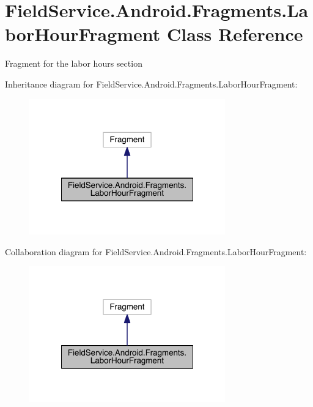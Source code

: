 \hypertarget{class_field_service_1_1_android_1_1_fragments_1_1_labor_hour_fragment}{\section{Field\+Service.\+Android.\+Fragments.\+Labor\+Hour\+Fragment Class Reference}
\label{class_field_service_1_1_android_1_1_fragments_1_1_labor_hour_fragment}
}


Fragment for the labor hours section  




Inheritance diagram for Field\+Service.\+Android.\+Fragments.\+Labor\+Hour\+Fragment\+:
\nopagebreak
\begin{figure}[H]
\begin{center}
\leavevmode
\includegraphics[width=240pt]{class_field_service_1_1_android_1_1_fragments_1_1_labor_hour_fragment__inherit__graph}
\end{center}
\end{figure}


Collaboration diagram for Field\+Service.\+Android.\+Fragments.\+Labor\+Hour\+Fragment\+:
\nopagebreak
\begin{figure}[H]
\begin{center}
\leavevmode
\includegraphics[width=240pt]{class_field_service_1_1_android_1_1_fragments_1_1_labor_hour_fragment__coll__graph}
\end{center}
\end{figure}
